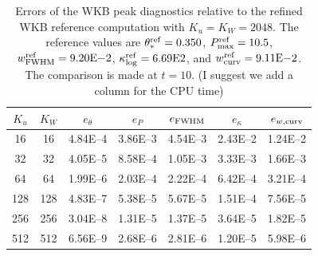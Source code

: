 \documentclass[11pt]{article}
\begin{document}
\begin{table}[htbp]
\centering
\caption{Errors of the WKB peak diagnostics relative to the refined WKB
reference computation with \(K_u=K_W=2048\).  The reference values are
\(\theta_*^{\rm ref}=0.350\), \(P_{\max}^{\rm ref}=10.5\),
\(w_{\rm FWHM}^{\rm ref}=9.20{\rm E}{-2}\),
\(\kappa_{\log}^{\rm ref}=6.69{\rm E}{2}\), and
\(w_{\rm curv}^{\rm ref}=9.11{\rm E}{-2}\).  The comparison is made at
\(t=10\). {\color{red} (I suggest we add a column for the CPU time)}}
\label{tab:wkb_peak_errors_ref2048}
\begin{tabular}{ccccccc}
\hline
$K_u$ & $K_W$ & $e_\theta$ & $e_P$ & $e_{\rm FWHM}$ & $e_\kappa$ & $e_{w,{\rm curv}}$ \\
\hline
16   & 16   & 4.84E--4 & 3.86E--3 & 4.54E--3 & 2.43E--2 & 1.24E--2 \\
32   & 32   & 4.05E--5 & 8.58E--4 & 1.05E--3 & 3.33E--3 & 1.66E--3 \\
64   & 64   & 1.99E--6 & 2.03E--4 & 2.22E--4 & 6.42E--4 & 3.21E--4 \\
128   & 128   & 4.83E--7 & 5.38E--5 & 5.67E--5 & 1.51E--4 & 7.56E--5 \\
256  & 256  & 3.04E--8 & 1.31E--5 & 1.37E--5 & 3.64E--5 & 1.82E--5 \\
512  & 512  & 6.56E--9 & 2.68E--6 & 2.81E--6 & 1.20E--5 & 5.98E--6 \\
\hline
\end{tabular}
\end{table}
\end{document}
